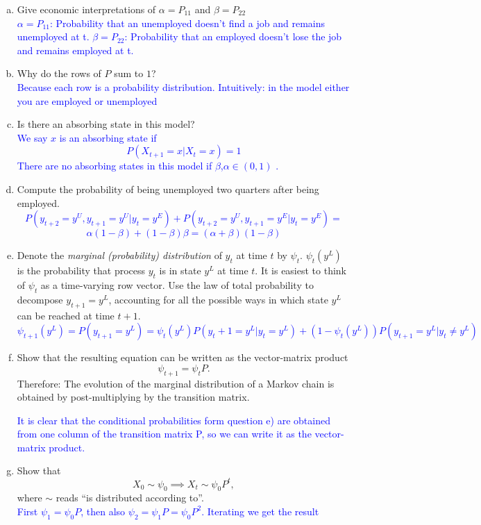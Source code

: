 \documentclass[11pt]{extarticle}
\theoremstyle{plain}
\theoremstyle{definition}
\begin{document}
\begin{enumerate}[(a)]
\item Give economic interpretations of $\alpha = P_{11}$ and $\beta = P_{22}$\\
\textcolor{blue}{$\alpha = P_{11}$: Probability that an unemployed doesn't find a job and remains unemployed at t.
$\beta = P_{22}$: Probability that an employed doesn't lose the job and remains employed at t. }

\item Why do the rows of $P$ sum to $1$?\\
\textcolor{blue}{Because each row is a probability distribution. Intuitively: in the model either you are employed or unemployed}

\item Is there an absorbing state in this model?\\
\textcolor{blue}{We say $x$ is an absorbing state if $$P(X_{t+1}=x|X_t=x)=1$$ There are no absorbing states in this model if $\beta$,$\alpha \in (0,1)$ .}

\item Compute the probability of being unemployed two quarters after being employed. \\
\textcolor{blue}{$$P(y_{t+2}=y^U,y_{t+1}=y^U|y_t=y^E)+P(y_{t+2}=y^U,y_{t+1}=y^E|y_t=y^E)=$$ $$\alpha (1-\beta)+(1-\beta)\beta = (\alpha+\beta)(1-\beta)$$}

\item Denote the \textit{marginal (probability) distribution} of $y_t$ at time $t$ by $\psi_t$. $\psi_t(y^L)$ is the probability that process $y_t$ is in state $y^L$ at time $t$. It is easiest to think of $\psi_t$ as a time-varying row vector. Use the law of total probability to decompose $y_{t+1} = y^L$, accounting for all the possible ways in which state $y^L$ can be reached at time $t+1$. \\
\textcolor{blue}{$$\psi_{t+1}(y^L) =  P(y_{t+1}=y^L)=\psi_t(y^L)P(y_t+1=y^L|y_t=y^L)+(1-\psi_t(y^L))P(y_{t+1}=y^L|y_t\neq y^L)$$ }

\item Show that the resulting equation can be written as the vector-matrix product
\begin{equation*}
	\psi_{t+1} = \psi_t P.
\end{equation*}
Therefore: The evolution of the marginal distribution of a Markov chain is obtained by post-multiplying by the transition matrix. 

\textcolor{blue}{It is clear that the conditional probabilities form question e) are obtained from one column of the transition matrix P, so we can write it as the vector-matrix product. }
\item Show that
\begin{equation*}
	X_0 \sim \psi_0 \implies X_t \sim \psi_0 P^t,
\end{equation*}
where $\sim$ reads ``is distributed according to''. \\
\textcolor{blue}{First $\psi_1=\psi_0 P$,  then also $\psi_2 = \psi_1 P = \psi_0 P^2 $. Iterating we get the result }


\end{enumerate}
\end{document}
